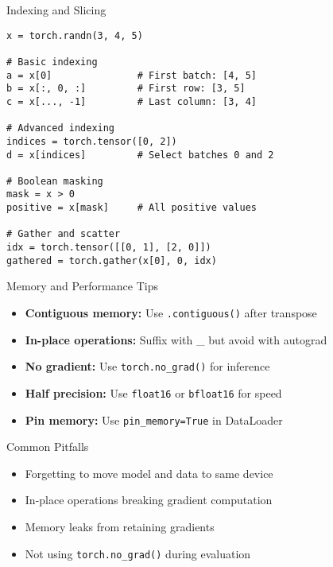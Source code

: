 \documentclass[aspectratio=169,10pt]{beamer}
\begin{document}
\begin{frame}[fragile]{Indexing and Slicing}
\begin{lstlisting}
x = torch.randn(3, 4, 5)

# Basic indexing
a = x[0]               # First batch: [4, 5]
b = x[:, 0, :]         # First row: [3, 5]
c = x[..., -1]         # Last column: [3, 4]

# Advanced indexing
indices = torch.tensor([0, 2])
d = x[indices]         # Select batches 0 and 2

# Boolean masking
mask = x > 0
positive = x[mask]     # All positive values

# Gather and scatter
idx = torch.tensor([[0, 1], [2, 0]])
gathered = torch.gather(x[0], 0, idx)
\end{lstlisting}
\end{frame}

\begin{frame}{Memory and Performance Tips}
\begin{itemize}
    \item \textbf{Contiguous memory:} Use \texttt{.contiguous()} after transpose
    \item \textbf{In-place operations:} Suffix with \_ but avoid with autograd
    \item \textbf{No gradient:} Use \texttt{torch.no\_grad()} for inference
    \item \textbf{Half precision:} Use \texttt{float16} or \texttt{bfloat16} for speed
    \item \textbf{Pin memory:} Use \texttt{pin\_memory=True} in DataLoader
\end{itemize}

\begin{block}{Common Pitfalls}
\begin{itemize}
    \item Forgetting to move model and data to same device
    \item In-place operations breaking gradient computation
    \item Memory leaks from retaining gradients
    \item Not using \texttt{torch.no\_grad()} during evaluation
\end{itemize}
\end{block}
\end{frame}
\end{document}
